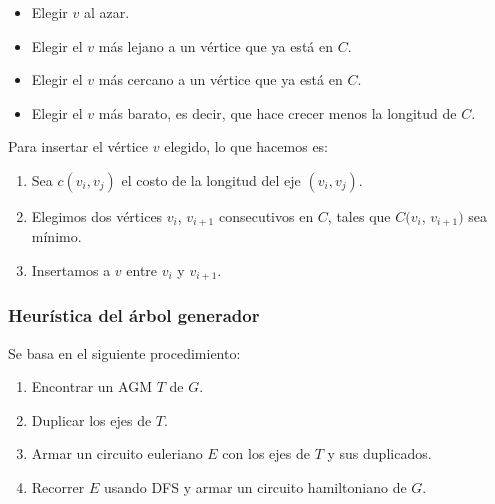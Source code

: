 \begin{itemize}
\item Elegir $v$ al azar.
\item Elegir el $v$ m\'as lejano a un v\'ertice que ya est\'a en $C$.
\item Elegir el $v$ m\'as cercano a un v\'ertice que ya est\'a en $C$.
\item Elegir el $v$ m\'as barato, es decir, que hace crecer menos la longitud de $C$.
\end{itemize}

Para insertar el v\'ertice $v$ elegido, lo que hacemos es:

\begin{enumerate}
\item Sea $c(v_i,v_j)$ el costo de la longitud del eje $(v_i,v_j)$.
\item Elegimos dos v\'ertices $v_i$, $v_{i+1}$ consecutivos en $C$, tales que $C(v_i$, $v_{i+1})$ sea m\'inimo.
\item Insertamos a $v$ entre $v_i$ y $v_{i+1}$.
\end{enumerate}

\subsubsection*{Heur\'istica del \'arbol generador}

Se basa en el siguiente procedimiento:

\begin{enumerate}
\item Encontrar un AGM $T$ de $G$.
\item Duplicar los ejes de $T$.
\item Armar un circuito euleriano $E$ con los ejes de $T$ y sus duplicados.
\item Recorrer $E$ usando DFS y armar un circuito hamiltoniano de $G$.
\end{enumerate}
